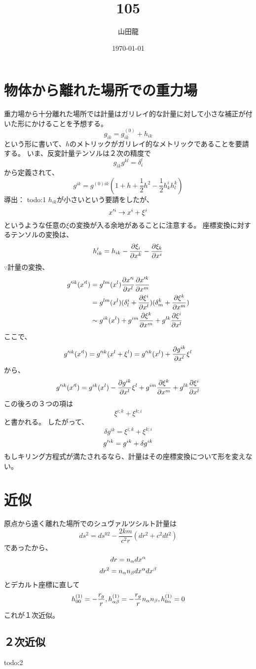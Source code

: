 \documentclass[twocolumn]{jsarticle}
\date{\today}
\author{山田龍}
\title{105}
\newcommand{\pder}[2][]{\frac{\partial#1}{\partial#2}}
\newcommand{\pderx}[2][]{\pder[#1]{x^{#2}}}
\newcommand{\pderxx}[2][]{\pder[x^{#1}]{x^{#2}}}
\newcommand{\pderugx}[2][]{\pderx[g^{#1}]{#2}}
\newcommand{\half}{\frac{1}{2}}
\newcommand{\beq}{\begin{equation}}
\newcommand{\eeq}{\end{equation}}
\begin{document}
\maketitle
\section{物体から離れた場所での重力場}
重力場から十分離れた場所では計量はガリレイ的な計量に対して小さな補正が付いた形にかけることを予想する。
\beq
g_{ik} = g^{(0)}_{ik} + h_{ik}
\eeq
という形に書いて、$h$のメトリックがガリレイ的なメトリックであることを要請する。
いま、反変計量テンソルは２次の精度で
\beq
    g_{ik}g^{kl} = \delta^l_i
\eeq
から定義されて、
\beq
g^{ik} = g^{(0)ik}(1 + h +\half h^2-\half h^i_k h^k_l)
\eeq
導出：
todo:1
$h_{ik}$が小さいという要請をしたが、
\beq
    x^{\pr i} \rightarrow x^i + \xi^i
\eeq
というような任意の$\xi$の変換が入る余地があることに注意する。
座標変換に対するテンソルの変換は、
\beq
h^{\pr}_{ik} = h_{ik} - \pder[\xi_i]{x^k} - \pder[\xi_k]{x^i} 
\eeq
$\because$計量の変換、
\begin{align}
    g^{\pr ik}(x^{\pr l}) &= g^{lm}(x^l) \pderxx[\pr i]{l} \pderxx[\pr k]{m}\\
                          &= g^{lm}(x^l)(\delta^i_l + \pderx[\xi^i]{l})(\delta^k_m + \pderx[\xi^k]{m})\\
                          &\sim g^{ik}(x^l) + g^{im}\pderx[\xi^k]{m}+ g^{lk}\pderx[\xi^i]{l}
\end{align}
ここで、
\beq
g^{\pr ik}(x^{\pr l}) =  g^{\pr ik}(x^l + \xi^l) = g^{\pr ik}(x^l) + \pderugx[ik]{l}\xi^l
\eeq
から、
\beq
g^{\pr ik}(x^{\pr l}) = g^{ik}(x^l) - \pderugx[ik]{l}\xi^l + g^{im}\pderx[\xi^k]{m}+ g^{lk}\pderx[\xi^i]{l}
\eeq
この後ろの３つの項は
\beq
    \xi^{i;k} + \xi^{k;i}
\eeq
と書かれる。
したがって、
\beq
\delta g^{ik} = \xi^{i;k} + \xi^{k;i}
\eeq
\beq
    g^{\pr ik} = g^{ik} + \delta g^{ik}
\eeq
もしキリング方程式が満たされるなら、計量はその座標変換について形を変えない。
\section{近似}
原点から遠く離れた場所でのシュヴァルツシルト計量は
\beq
    ds^2 = ds^{0 2} - \frac{2km}{c^2r}(dr^2 + c^2dt^2)
\eeq
であったから、
\beq
dr = n_\al dx^\al
\eeq
\beq
dr^2 = n_\al n_\be dx^\al dx^\be
\eeq
とデカルト座標に直して
\beq
h^{(1)}_{00} = -\frac{r_g}{r},h^{(1)}_{\al \be} = -\frac{r_g}{r}n_\al n_\be,h^{(1)}_{0 \al} = 0
\eeq
これが１次近似。
\subsection{２次近似}
todo:2
\end{document}
